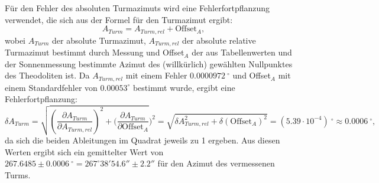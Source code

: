 Für den Fehler des absoluten Turmazimuts wird eine Fehlerfortpflanzung verwendet, die sich aus der Formel für den Turmazimut ergibt: 
\begin{equation}
A_{Turm} = A_{Turm, rel} + \mathrm{Offset}_A, 
\end{equation}
wobei $A_{Turm}$ der absolute Turmazimut, $A_{Turm, rel}$ der absolute relative Turmazimut bestimmt durch Messung und Offset$_A$ der aus Tabellenwerten und der Sonnenmessung bestimmte Azimut des (willkürlich) gewählten Nullpunktes des Theodoliten ist. 
Da $A_{Turm, rel}$ mit einem Fehler $0.0000972 \ ^\circ$ und Offset$_A$ mit einem Standardfehler von $0.00053 ^\circ$ bestimmt wurde, ergibt eine Fehlerfortpflanzung: 
\begin{equation}
\delta A_{Turm} = \sqrt{(\frac{\partial A_{Turm}}{\partial A_{Turm, rel}})^2 + (\frac{\partial A_{Turm}}{\partial \mathrm{Offset}_A}})^2 = \sqrt{\delta A_{Turm, rel}^2 + \delta (\mathrm{Offset}_A)^2} = (5.39 \cdot 10^{-4})\ ^\circ \approx 0.0006\ ^\circ,
\end{equation}
da sich die beiden Ableitungen im Quadrat jeweils zu 1 ergeben.
Aus diesen Werten ergibt sich ein gemittelter Wert von $267.6485 \pm 0.0006\  ^\circ = 267 ^\circ 38 \mathrm{'} 54.6 \mathrm{''} \pm 2.2 \mathrm{''}$ für den Azimut des vermessenen Turms. \\
